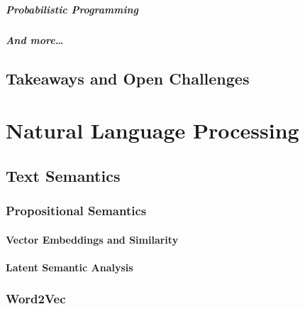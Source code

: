 		\paragraph{Probabilistic Programming} %

		\paragraph{And more\dots} %

	\section{Takeaways and Open Challenges} %

\chapter{Natural Language Processing} %

	\section{Text Semantics} %

		\subsection{Propositional Semantics} %

			\subsubsection{Vector Embeddings and Similarity} %

			\subsubsection{Latent Semantic Analysis} %

		\subsection{Word2Vec} %

